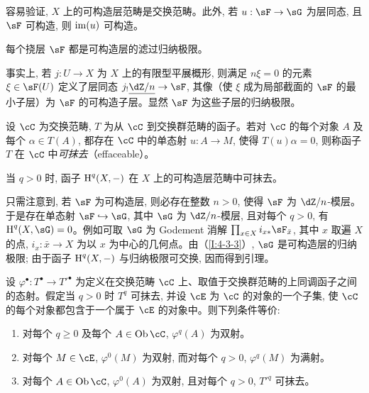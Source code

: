 容易验证, $X$ 上的可构造层范畴是交换范畴。此外, 若 $u:\sF\to\sG$ 为层同态, 且 $\sF$ 可构造, 则 $\operatorname{im}(u)$ 可构造。

\begin{lemma}\label{I:4-3-3}
每个挠层 $\sF$ 都是可构造层的滤过归纳极限。
\end{lemma}

事实上, 若 $j:U\to X$ 为 $X$ 上的有限型平展概形, 则满足 $n\xi=0$ 的元素 $\xi\in\sF(U)$ 定义了层同态 $j_!\const{\dZ/n}\to\sF$, 其像（使 $\xi$ 成为局部截面的 $\sF$ 的最小子层）为 $\sF$ 的可构造子层。显然 $\sF$ 为这些子层的归纳极限。

\begin{definition}\label{I:4-3-4}
设 $\cC$ 为交换范畴, $T$ 为从 $\cC$ 到交换群范畴的函子。若对 $\cC$ 的每个对象 $A$ 及每个 $\alpha\in T(A)$, 都存在 $\cC$ 中的单态射 $u:A\to M$, 使得 $T(u)\alpha=0$, 则称函子 $T$ 在 $\cC$ 中\emph{可抹去}（effaceable）。
\end{definition}

\begin{lemma}\label{I:4-3-5}
当 $q>0$ 时, 函子 $\operatorname{H}^q(X,-)$ 在 $X$ 上的可构造层范畴中可抹去。
\end{lemma}

只需注意到, 若 $\sF$ 为可构造层, 则必存在整数 $n>0$, 使得 $\sF$ 为 $\dZ/n$-模层。于是存在单态射 $\sF\hookrightarrow\sG$, 其中 $\sG$ 为 $\dZ/n$-模层, 且对每个 $q>0$, 有 $\h^q(X,\sG)=0$。例如可取 $\sG$ 为 Godement 消解 $\prod_{x\in X}i_{x*}\sF_{\bar x}$, 其中 $x$ 取遍 $X$ 的点, $i_x:\bar x\to X$ 为以 $x$ 为中心的几何点。由（\ref{I:4-3-3}）, $\sG$ 是可构造层的归纳极限; 由于函子 $\operatorname{H}^q(X,-)$ 与归纳极限可交换, 因而得到引理。

\begin{lemma}\label{I:4-3-6}
设 $\varphi^\bullet:T^\bullet\to{T'}^\bullet$ 为定义在交换范畴 $\cC$ 上、取值于交换群范畴的上同调函子之间的态射。假定当 $q>0$ 时 $T^q$ 可抹去, 并设 $\cE$ 为 $\cC$ 的对象的一个子集, 使 $\cC$ 的每个对象都包含于一个属于 $\cE$ 的对象中。则下列条件等价:
\begin{enumerate}[\indent (i)]
  \item 对每个 $q\geqslant0$ 及每个 $A\in\ob\cC$, $\varphi^q(A)$ 为双射。
  \item 对每个 $M\in\cE$, $\varphi^0(M)$ 为双射, 而对每个 $q>0$, $\varphi^q(M)$ 为满射。
  \item 对每个 $A\in\ob\cC$, $\varphi^0(A)$ 为双射, 且对每个 $q>0$, ${T'}^q$ 可抹去。
\end{enumerate}
\end{lemma}

